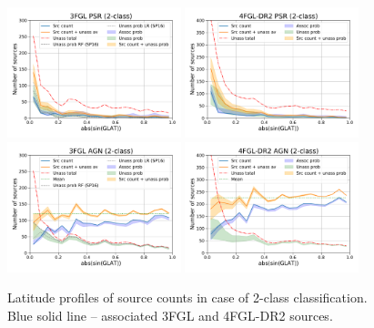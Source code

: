 \begin{figure}[h]
\center
\includegraphics[width=0.45\textwidth]{plots/lat_profile_PSR_3FGL_2classes.pdf}
\includegraphics[width=0.45\textwidth]{plots/lat_profile_PSR_4FGL-DR2_2classes.pdf} \\
\includegraphics[width=0.45\textwidth]{plots/lat_profile_AGN_3FGL_2classes.pdf}
\includegraphics[width=0.45\textwidth]{plots/lat_profile_AGN_4FGL-DR2_2classes.pdf}
\caption{Latitude profiles of source counts in case of 2-class classification. 
Blue solid line -- associated 3FGL and 4FGL-DR2  sources. 
}
\end{figure}
